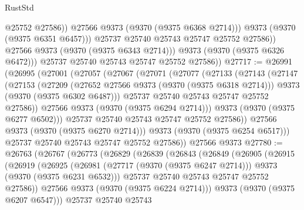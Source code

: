 \begin{lexlean}{RustStd}
\begin{coremodule}
                        @25752
                        @27586))
                    @27566
                    @9373
                    (@9370 (@9375 @6368 @2714)))
                  @9373
                  (@9370 (@9375 @6351 @6457)))
                @25737
                @25740
                @25743
                @25747
                @25752
                @27586))
            @27566
            @9373
            (@9370 (@9375 @6343 @2714)))
          @9373
          (@9370 (@9375 @6326 @6472)))
        @25737
        @25740
        @25743
        @25747
        @25752
        @27586))
@27717 := @26991
    (@26995
      (@27001
        (@27057
          (@27067
            (@27071
              (@27077
                (@27133
                  (@27143
                    (@27147
                      (@27153
                        (@27209
                          (@27652 @27566 @9373 (@9370 (@9375 @6318 @2714)))
                          @9373
                          (@9370 (@9375 @6302 @6487)))
                        @25737
                        @25740
                        @25743
                        @25747
                        @25752
                        @27586))
                    @27566
                    @9373
                    (@9370 (@9375 @6294 @2714)))
                  @9373
                  (@9370 (@9375 @6277 @6502)))
                @25737
                @25740
                @25743
                @25747
                @25752
                @27586))
            @27566
            @9373
            (@9370 (@9375 @6270 @2714)))
          @9373
          (@9370 (@9375 @6254 @6517)))
        @25737
        @25740
        @25743
        @25747
        @25752
        @27586))
    @27566
    @9373
@27780 := @26763
    (@26767
      (@26773
        (@26829
          (@26839
            (@26843
              (@26849
                (@26905
                  (@26915
                    (@26919
                      (@26925
                        (@26981
                          (@27717 (@9370 (@9375 @6247 @2714)))
                          @9373
                          (@9370 (@9375 @6231 @6532)))
                        @25737
                        @25740
                        @25743
                        @25747
                        @25752
                        @27586))
                    @27566
                    @9373
                    (@9370 (@9375 @6224 @2714)))
                  @9373
                  (@9370 (@9375 @6207 @6547)))
                @25737
                @25740
                @25743

\end{coremodule}
\end{lexlean}
